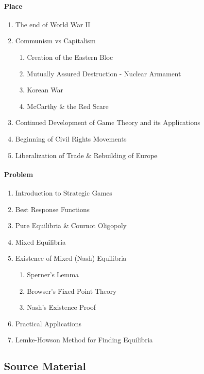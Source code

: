 \documentclass[11pt]{article}
\begin{document}
\paragraph{Place}
\begin{enumerate}
	\item The end of World War II
	\item Communism vs Capitalism
	\begin{enumerate}
		\item Creation of the Eastern Bloc
		\item Mutually Assured Destruction - Nuclear Armament
		\item Korean War
		\item McCarthy \& the Red Scare
	\end{enumerate}
	\item Continued Development of Game Theory and its Applications
	\item Beginning of Civil Rights Movements
	\item Liberalization of Trade \& Rebuilding of Europe
\end{enumerate}

\paragraph{Problem}
\begin{enumerate}
	\item Introduction to Strategic Games
	\item Best Response Functions
	\item Pure Equilibria \& Cournot Oligopoly
	\item Mixed Equilibria
	\item Existence of Mixed (Nash) Equilibria
	\begin{enumerate}
		\item Sperner's Lemma
		\item Browser's Fixed Point Theory
		\item Nash's Existence Proof
	\end{enumerate}
	\item Practical Applications
	\item Lemke-Howson Method for Finding Equilibria
\end{enumerate}



\subsection*{Source Material}
\end{document}
